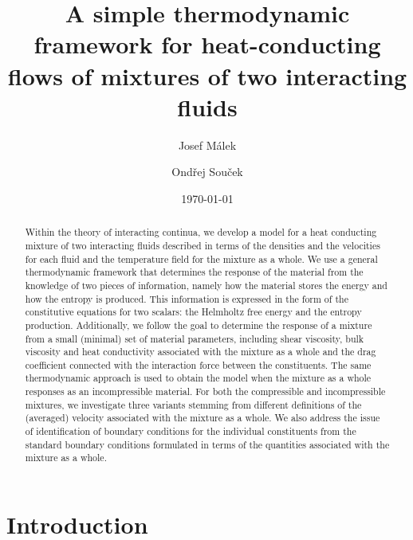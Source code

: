 \documentclass[a4paper]{article}
\title{A simple thermodynamic framework for heat-conducting flows of mixtures of two interacting fluids}
\date{}                     %
\author[1]{Josef M\'{a}lek}
\author[1]{Ond\v{r}ej Sou\v{c}ek}
\affil[1]{Charles University, Faculty of Mathematics and Physics, Mathematical Institute, Sokolovsk\'{a} 83, 186 75 Prague 8, Czech Republic}
\date{\today}
\begin{document}


\newtheorem{remark}{Remark}

\maketitle

\begin{abstract}
Within the theory of interacting continua, we develop a model for a heat conducting mixture of two interacting fluids described in terms of the densities and the velocities for each fluid and the temperature field for the mixture as a whole. We use a general thermodynamic framework that determines the response of the material from the knowledge of two pieces of information, namely how the material stores the energy and how the entropy is produced. This information is expressed in the form of the constitutive equations for two scalars: the Helmholtz free energy and the entropy production. Additionally, we follow the goal to determine the response of a mixture from a small (minimal) set of material parameters, including shear viscosity, bulk viscosity and heat conductivity associated with the mixture as a whole and the drag coefficient connected with the interaction force between the constituents. The same thermodynamic approach is used to obtain the model when the mixture as a whole responses as an incompressible material. For both the compressible and incompressible mixtures, we investigate three variants stemming from different definitions of the (averaged) velocity associated with the mixture as a whole. We also address the issue of identification of boundary conditions for the individual constituents from the standard boundary conditions formulated in terms of the quantities associated with the mixture as a whole.\end{abstract}

\section{Introduction}
\end{document}
